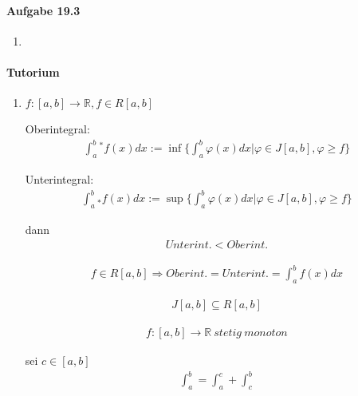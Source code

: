 \paragraph{Aufgabe 19.3}

\begin{enumerate}

\item[]

\end{enumerate}

\newpage

\paragraph{Tutorium}

\begin{enumerate}

\item[]

$f:[a,b]\rightarrow\mathbb{R},f\in R[a,b]$

Oberintegral:
\begin{align*}
\int_a^b {}^* f(x)dx:=\inf\{\int_a^b\varphi(x)dx|\varphi\in J[a,b],\varphi\geq f\}
\end{align*}

Unterintegral:
\begin{align*}
\int_a^b {}_* f(x)dx:=\sup\{\int_a^b\varphi(x)dx|\varphi\in J[a,b],\varphi\geq f\}
\end{align*}

dann
\begin{align*}
Unterint.<Oberint.
\end{align*}

\begin{align*}
f\in R[a,b]\Rightarrow Oberint.=Unterint.=\int_a^b f(x)dx
\end{align*}

\begin{align*}
J[a,b]\subseteq R[a,b]
\end{align*}

\begin{align*}
f:[a,b]\rightarrow\mathbb{R}\ stetig\ monoton
\end{align*}

sei $c\in[a,b]$
\begin{align*}
\int_a^b=\int_a^c+\int_c^b
\end{align*}

\end{enumerate}